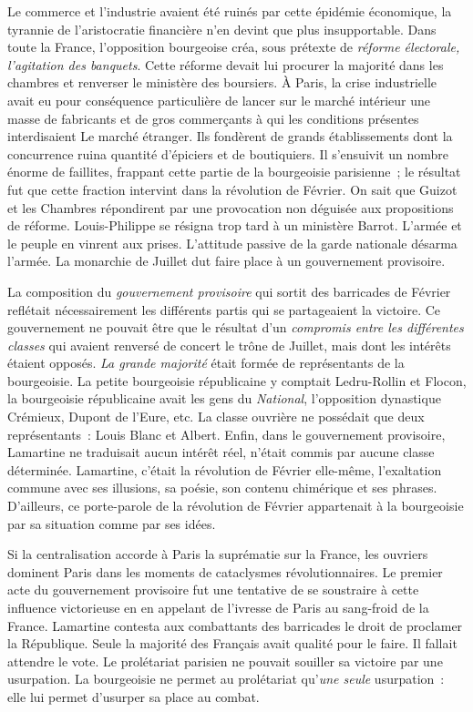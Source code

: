 \documentclass[twoside]{book} %
\begin{document}
Le commerce et l’industrie avaient été ruinés par cette épidémie économique, la tyrannie de l’aristocratie financière n’en devint que plus insupportable. Dans toute la France, l’opposition bourgeoise créa, sous prétexte de \emph{réforme électorale, l’agitation des banquets}. Cette réforme devait lui procurer la majorité dans les chambres et renverser le ministère des boursiers. À Paris, la crise industrielle avait eu pour conséquence particulière de lancer sur le marché intérieur une masse de fabricants et de gros commerçants à qui les conditions présentes interdisaient Le marché étranger. Ils fondèrent de grands établissements dont la concurrence ruina quantité d’épiciers et de boutiquiers. Il s’ensuivit un nombre énorme de faillites, frappant cette partie de la bourgeoisie parisienne ; le résultat fut que cette fraction intervint dans la révolution de Février. On sait que Guizot et les Chambres répondirent par une provocation non déguisée aux propositions de réforme. Louis-Philippe se résigna trop tard à un ministère Barrot. L’armée et le peuple en vinrent aux prises. L’attitude passive de la garde nationale désarma l’armée. La monarchie de Juillet dut faire place à un gouvernement provisoire.\par
La composition du \emph{gouvernement provisoire} qui sortit des barricades de Février reflétait nécessairement les différents partis qui se partageaient la victoire. Ce gouvernement ne pouvait être que le résultat d’un \emph{compromis entre les différentes classes} qui avaient renversé de concert le trône de Juillet, mais dont les intérêts étaient opposés. \emph{La grande majorité} était formée de représentants de la bourgeoisie. La petite bourgeoisie républicaine y comptait Ledru-Rollin et Flocon, la bourgeoisie républicaine avait les gens du \emph{National}, l’opposition dynastique Crémieux, Dupont de l’Eure, etc. La classe ouvrière ne possédait que deux représentants : Louis Blanc et Albert. Enfin, dans le gouvernement provisoire, Lamartine ne traduisait aucun intérêt réel, n’était commis par aucune classe déterminée. Lamartine, c’était la révolution de Février elle-même, l’exaltation commune avec ses illusions, sa poésie, son contenu chimérique et ses phrases. D’ailleurs, ce porte-parole de la révolution de Février appartenait à la bourgeoisie par sa situation comme par ses idées.\par
Si la centralisation accorde à Paris la suprématie sur la France, les ouvriers dominent Paris dans les moments de cataclysmes révolutionnaires. Le premier acte du gouvernement provisoire fut une tentative de se soustraire à cette influence victorieuse en en appelant de l’ivresse de Paris au sang-froid de la France. Lamartine contesta aux combattants des barricades le droit de proclamer la République. Seule la majorité des Français avait qualité pour le faire. Il fallait attendre le vote. Le prolétariat parisien ne pouvait souiller sa victoire par une usurpation. La bourgeoisie ne permet au prolétariat qu’\emph{une seule} usurpation : elle lui permet d’usurper sa place au combat.\par
\end{document}
